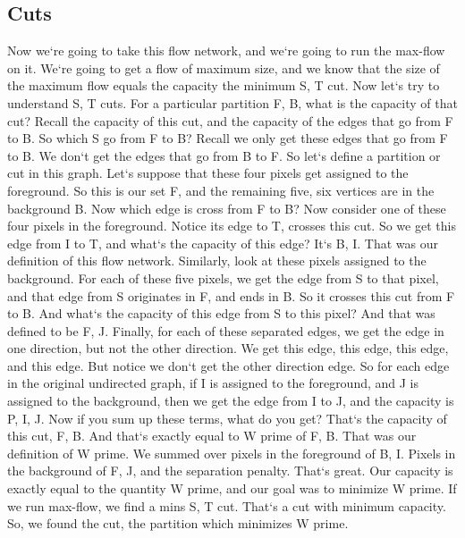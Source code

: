 \subsection{Cuts}
Now we`re going to take this flow network, and we`re going to run the max-flow on it.
We`re going to get a flow of maximum size, and we know that the size of the maximum flow equals the capacity the minimum S, T cut.
Now let`s try to understand S, T cuts.
For a particular partition F, B, what is the capacity of that cut? Recall the capacity of this cut, and the capacity of the edges that go from F to B\@.
So which S go from F to B? Recall we only get these edges that go from F to B\@.
We don`t get the edges that go from B to F\@.
So let`s define a partition or cut in this graph.
Let`s suppose that these four pixels get assigned to the foreground.
So this is our set F, and the remaining five, six vertices are in the background B\@.
Now which edge is cross from F to B? Now consider one of these four pixels in the foreground.
Notice its edge to T, crosses this cut.
So we get this edge from I to T, and what`s the capacity of this edge? It`s B, I\@.
That was our definition of this flow network.
Similarly, look at these pixels assigned to the background.
For each of these five pixels, we get the edge from S to that pixel, and that edge from S originates in F, and ends in B\@.
So it crosses this cut from F to B\@.
And what`s the capacity of this edge from S to this pixel? And that was defined to be F, J\@.
Finally, for each of these separated edges, we get the edge in one direction, but not the other direction.
We get this edge, this edge, this edge, and this edge.
But notice we don`t get the other direction edge.
So for each edge in the original undirected graph, if I is assigned to the foreground, and J is assigned to the background, then we get the edge from I to J, and the capacity is P, I, J\@.
Now if you sum up these terms, what do you get? That`s the capacity of this cut, F, B\@.
And that`s exactly equal to W prime of F, B\@.
That was our definition of W prime.
We summed over pixels in the foreground of B, I\@.
Pixels in the background of F, J, and the separation penalty.
That`s great.
Our capacity is exactly equal to the quantity W prime, and our goal was to minimize W prime.
If we run max-flow, we find a mins S, T cut.
That`s a cut with minimum capacity.
So, we found the cut, the partition which minimizes W prime.


